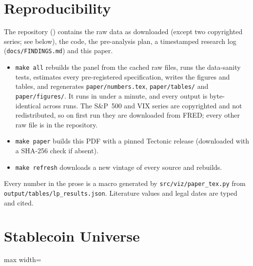 \section{Reproducibility}\label{app:repro}
The repository (\repo) contains the raw data as downloaded (except two copyrighted series; see below), the code, the pre-analysis plan, a timestamped research log (\texttt{docs/FINDINGS.md}) and this paper.
\begin{itemize}
\item \texttt{make all} rebuilds the panel from the cached raw files, runs the data-sanity tests, estimates every pre-registered specification, writes the figures and tables, and regenerates \texttt{paper/numbers.tex}, \texttt{paper/tables/} and \texttt{paper/figures/}. It runs in under a minute, and every output is byte-identical across runs. The S\&P~500 and VIX series are copyrighted and not redistributed, so on first run they are downloaded from FRED; every other raw file is in the repository.
\item \texttt{make paper} builds this PDF with a pinned Tectonic release (downloaded with a SHA-256 check if absent).
\item \texttt{make refresh} downloads a new vintage of every source and rebuilds.
\end{itemize}
{\sloppy Every number in the prose is a macro generated by \texttt{src/viz/paper\_tex.py} from \texttt{output/tables/lp\_results.json}. Literature values and legal dates are typed and cited.\par}

\section{Stablecoin Universe}\label{app:universe}

\begin{table}[!h]
\centering
\caption{Primary universe (fiat-backed USD payment stablecoins)}
\label{tab:universe}
\footnotesize
\begin{adjustbox}{max width=\columnwidth}

\end{adjustbox}
\end{table}


